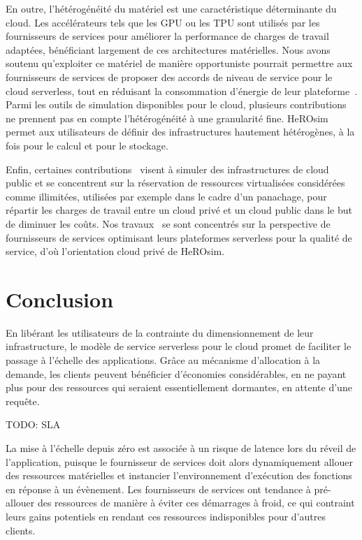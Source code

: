 En outre, l'hétérogénéité du matériel est une caractéristique déterminante du cloud. Les accélérateurs tels que les \gls{GPU} ou les \gls{TPU} sont utilisés par les fournisseurs de services pour améliorer la performance de charges de travail adaptées, bénéficiant largement de ces architectures matérielles. Nous avons soutenu qu'exploiter ce matériel de manière opportuniste pourrait permettre aux fournisseurs de services de proposer des accords de niveau de service pour le cloud serverless, tout en réduisant la consommation d'énergie de leur plateforme~\cite{herofake}.
Parmi les outils de simulation disponibles pour le cloud, plusieurs contributions~\cite{jeonCloudSimExtensionSimulatingDistributed2019, cai_elasticsim_2017, nunez_icancloud_2012, mahmoudiSimFaaSPerformanceSimulator2021} ne prennent pas en compte l'hétérogénéité à une granularité fine. HeROsim permet aux utilisateurs de définir des infrastructures hautement hétérogènes, à la fois pour le calcul et pour le stockage.

Enfin, certaines contributions~\cite{nunez_icancloud_2012, mahmoudiSimFaaSPerformanceSimulator2021} visent à simuler des infrastructures de cloud public et se concentrent sur la réservation de ressources virtualisées considérées comme illimitées, utilisées par exemple dans le cadre d'un panachage, pour répartir les charges de travail entre un cloud privé et un cloud public dans le but de diminuer les coûts.
Nos travaux~\cite{herofake, herocache} se sont concentrés sur la perspective de fournisseurs de services optimisant leurs plateformes serverless pour la qualité de service, d'où l'orientation cloud privé de HeROsim.

\section{Conclusion}

En libérant les utilisateurs de la contrainte du dimensionnement de leur infrastructure, le modèle de service serverless pour le cloud promet de faciliter le passage à l'échelle des applications. Grâce au mécanisme d'allocation à la demande, les clients peuvent bénéficier d'économies considérables, en ne payant plus pour des ressources qui seraient essentiellement dormantes, en attente d'une requête.

TODO: SLA

La mise à l'échelle depuis zéro est associée à un risque de latence lors du réveil de l'application, puisque le fournisseur de services doit alors dynamiquement allouer des ressources matérielles et instancier l'environnement d'exécution des fonctions en réponse à un évènement. Les fournisseurs de services ont tendance à pré-allouer des ressources de manière à éviter ces démarrages à froid, ce qui contraint leurs gains potentiels en rendant ces ressources indisponibles pour d'autres clients.

